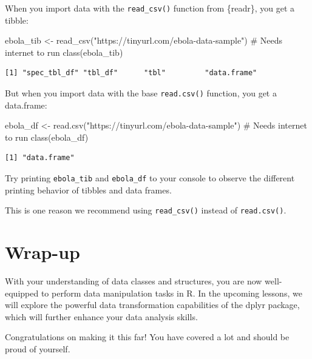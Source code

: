 \documentclass[
  letterpaper,
  DIV=11,
  numbers=noendperiod]{scrreprt}
\newenvironment{Shaded}{\begin{snugshade}}{\end{snugshade}}
\newcommand{\CommentTok}[1]{\textcolor[rgb]{0.37,0.37,0.37}{#1}}
\newcommand{\FunctionTok}[1]{\textcolor[rgb]{0.28,0.35,0.67}{#1}}
\newcommand{\NormalTok}[1]{\textcolor[rgb]{0.00,0.23,0.31}{#1}}
\newcommand{\OtherTok}[1]{\textcolor[rgb]{0.00,0.23,0.31}{#1}}
\newcommand{\StringTok}[1]{\textcolor[rgb]{0.13,0.47,0.30}{#1}}
\begin{document}
When you import data with the \texttt{read\_csv()} function from
\{readr\}, you get a tibble:

\begin{Shaded}
\begin{Highlighting}[]
\NormalTok{ebola\_tib }\OtherTok{\textless{}{-}} \FunctionTok{read\_csv}\NormalTok{(}\StringTok{"https://tinyurl.com/ebola{-}data{-}sample"}\NormalTok{) }\CommentTok{\# Needs internet to run}
\FunctionTok{class}\NormalTok{(ebola\_tib)}
\end{Highlighting}
\end{Shaded}

\begin{verbatim}
[1] "spec_tbl_df" "tbl_df"      "tbl"         "data.frame" 
\end{verbatim}

But when you import data with the base \texttt{read.csv()} function, you
get a data.frame:

\begin{Shaded}
\begin{Highlighting}[]
\NormalTok{ebola\_df }\OtherTok{\textless{}{-}} \FunctionTok{read.csv}\NormalTok{(}\StringTok{"https://tinyurl.com/ebola{-}data{-}sample"}\NormalTok{) }\CommentTok{\# Needs internet to run}
\FunctionTok{class}\NormalTok{(ebola\_df)}
\end{Highlighting}
\end{Shaded}

\begin{verbatim}
[1] "data.frame"
\end{verbatim}

Try printing \texttt{ebola\_tib} and \texttt{ebola\_df} to your console
to observe the different printing behavior of tibbles and data frames.

This is one reason we recommend using \texttt{read\_csv()} instead of
\texttt{read.csv()}.

\hypertarget{wrap-up-2}{%
\section{Wrap-up}\label{wrap-up-2}}

With your understanding of data classes and structures, you are now
well-equipped to perform data manipulation tasks in R. In the upcoming
lessons, we will explore the powerful data transformation capabilities
of the dplyr package, which will further enhance your data analysis
skills.

Congratulations on making it this far! You have covered a lot and should
be proud of yourself.
\end{document}
